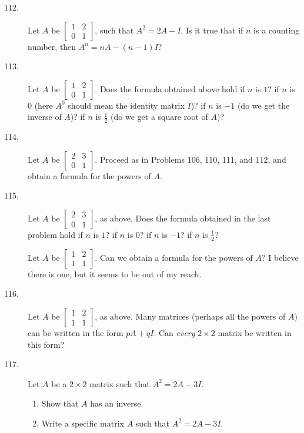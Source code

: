 \documentclass{article}
\begin{document}
\begin{description}
  \item[112.] Let $A$ be $\begin{bmatrix} 1 & 2 \\ 0 & 1 \end{bmatrix}$, such that $A^2 = 2A-I$. Is it true that if $n$ is a counting number, then $A^n = nA - (n-1)I$?

  \item[113.] Let $A$ be $\begin{bmatrix} 1 & 2 \\ 0 & 1 \end{bmatrix}$. Does the formula obtained above hold if $n$ is $1$? if $n$ is $0$ (here $A^0$ should mean the identity matrix $I$)? if $n$ is $-1$ (do we get the inverse of $A$)? if $n$ is $\frac{1}{2}$ (do we get a square root of $A$)?

  \item[114.] Let $A$ be $\begin{bmatrix} 2 & 3 \\ 0 & 1 \end{bmatrix}$. Proceed as in Problems 106, 110, 111, and 112, and obtain a formula for the powers of $A$.

  \item[115.] Let $A$ be $\begin{bmatrix} 2 & 3 \\ 0 & 1 \end{bmatrix}$, as above. Does the formula obtained in the last problem hold if $n$ is $1$? if $n$ is $0$? if $n$ is $-1$? if $n$ is $\frac{1}{2}$?

  \item[] Let $A$ be $\begin{bmatrix} 1 & 2 \\ 1 & 1 \end{bmatrix}$. Can we obtain a formula for the powers of $A$? I believe there is one, but it seems to be out of my reach.

  \item[116.] Let $A$ be $\begin{bmatrix} 1 & 2 \\ 1 & 1 \end{bmatrix}$, as above. Many matrices (perhaps all the powers of $A$) can be written in the form $pA+qI$. Can \emph{every} $2 \times 2$ matrix be written in this form?

  \item[117.] Let $A$ be a $2 \times 2$ matrix such that $A^2 = 2A - 3I$.
    \begin{enumerate}[\hspace{1cm}(a)]
      \item Show that $A$ has an inverse.
      \item Write a specific matrix $A$ such that $A^2 = 2A - 3I$.
    \end{enumerate}


\end{description}
\end{document}
